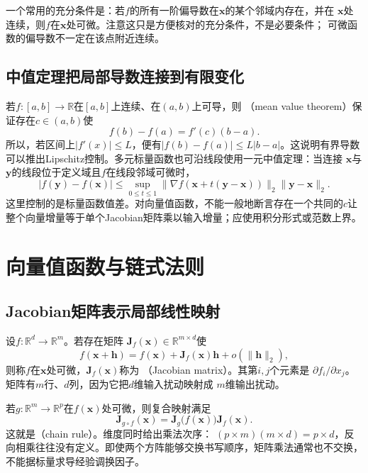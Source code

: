 一个常用的充分条件是：若$f$的所有一阶偏导数在$\bm{x}$的某个邻域内存在，并在 $\bm{x}$处连续，则$f$在$\bm{x}$处可微。注意这只是方便核对的充分条件，不是必要条件； 可微函数的偏导数不一定在该点附近连续。
\subsection{中值定理把局部导数连接到有限变化}

若$f:[a,b]\to\mathbb{R}$在$[a,b]$上连续、在$(a,b)$上可导，则
（mean value theorem）保证存在$c\in(a,b)$使
\begin{equation}
  f(b)-f(a)=f'(c)(b-a).
\label{eq:analysis-mean-value-theorem}
\end{equation}
所以，若区间上$|f'(x)|\leq L$，便有$|f(b)-f(a)|\leq L|b-a|$。这说明有界导数可以推出Lipschitz控制。多元标量函数也可沿线段使用一元中值定理：当连接 $\bm{x}$与$\bm{y}$的线段位于定义域且$f$在线段邻域可微时，
\[   |f(\bm{y})-f(\bm{x})|   \leq   \sup_{0\leq t\leq1}   \lVert\nabla f(\bm{x}+t(\bm{y}-\bm{x}))\rVert_2   \lVert\bm{y}-\bm{x}\rVert_2. \]
这里控制的是标量函数值差。对向量值函数，不能一般地断言存在一个共同的$c$让整个向量增量等于单个Jacobian矩阵乘以输入增量；应使用积分形式或范数上界。
\section{向量值函数与链式法则}
\label{sec:analysis-vector-chain-matrix-calculus}
\subsection{Jacobian矩阵表示局部线性映射}

设$f:\mathbb{R}^d\to\mathbb{R}^m$。若存在矩阵 $\bm{J}_f(\bm{x})\in\mathbb{R}^{m\times d}$使
\begin{equation}
  f(\bm{x}+\bm{h})
  =
  f(\bm{x})+\bm{J}_f(\bm{x})\bm{h}
  +o(\lVert\bm{h}\rVert_2),
\label{eq:analysis-jacobian-linearization}
\end{equation}
则称$f$在$\bm{x}$处可微，$\bm{J}_f(\bm{x})$称为
（Jacobian matrix）。其第$i,j$个元素是 $\partial f_i/\partial x_j$。矩阵有$m$行、$d$列，因为它把$d$维输入扰动映射成 $m$维输出扰动。

若$g:\mathbb{R}^m\to\mathbb{R}^p$在$f(\bm{x})$处可微，则复合映射满足
\begin{equation}
  \bm{J}_{g\circ f}(\bm{x})
  =
  \bm{J}_g\bigl(f(\bm{x})\bigr)\bm{J}_f(\bm{x}).
\label{eq:analysis-vector-chain-rule}
\end{equation}
这就是（chain rule）。维度同时给出乘法次序： $(p\times m)(m\times d)=p\times d$，反向相乘往往没有定义。即使两个方阵能够交换书写顺序，矩阵乘法通常也不交换，不能据标量求导经验调换因子。

